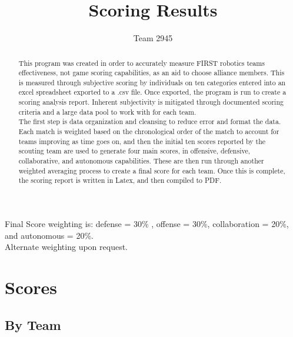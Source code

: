\documentclass[landscape, 10pt]{report}
\begin{document}
 
\title{Scoring Results} 
\author{Team 2945} 
\maketitle 
 
\begin{abstract} 
\large This program was created in order to accurately measure FIRST robotics teams effectiveness, not game scoring capabilities, as an aid to choose alliance members. This is measured through subjective scoring by individuals on ten categories entered into an excel spreadsheet exported to a .csv file. Once exported, the program is run to create a scoring analysis report. Inherent subjectivity is mitigated through documented scoring criteria and a large data pool to work with for each team.\\ 
 \large The first step is data organization and cleansing to reduce error and format the data. Each match is weighted based on the chronological order of the match to account for teams improving as time goes on, and then the initial ten scores reported by the scouting team are used to generate four main scores, in offensive, defensive, collaborative, and autonomous capabilities. These are then run through another weighted averaging process to create a final score for each team. Once this is complete, the scoring report is written in Latex, and then compiled to PDF. 
\end{abstract} 
\begin{center} 
Final Score weighting is: defense = 30\% , offense = 30\%, collaboration = 20\%, and autonomous = 20\%. \\ 
Alternate weighting upon request. 
 \end{center} 
 
\section*{Scores} 
\subsection*{By Team} 
\end{document}
